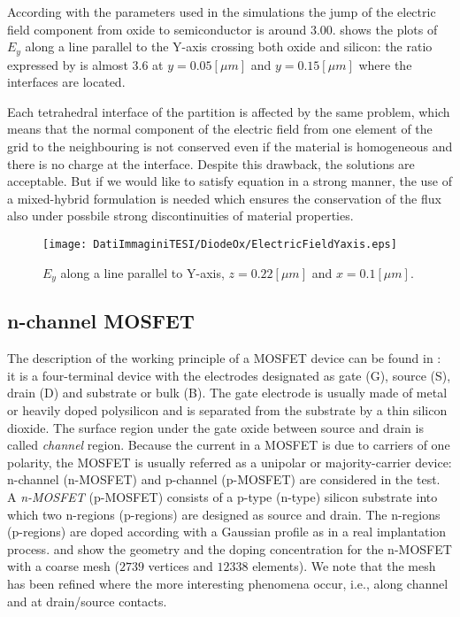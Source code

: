 According with the parameters used in the simulations the jump of the electric field component from oxide to semiconductor is around $3.00$.  shows the plots of $E_y$ along a line parallel to the Y-axis crossing both oxide and silicon: the ratio expressed by  is almost $3.6$ at $y=0.05[\mu m]$ and $y = 0.15[\mu m]$ where the interfaces are located.

Each tetrahedral interface of the partition is affected by the same problem, which means that the normal component of the electric field from one element of the grid to the neighbouring is not conserved even if the material is homogeneous and there is no charge at the interface. Despite this drawback, the solutions are acceptable. But if we would like to satisfy equation  in a strong manner, the use of a mixed-hybrid formulation is needed which ensures the conservation of the flux also under possbile strong discontinuities of material properties.


\begin{figure}[!h]
\centering
\texttt{[image: DatiImmaginiTESI/DiodeOx/ElectricFieldYaxis.eps]}
\caption{$E_y$ along a line parallel to Y-axis, $z=0.22[\mu m]$ and $x=0.1[\mu m]$.}
\label{fig: salto electric field}
\end{figure}


\clearpage





\subsection{n-channel MOSFET}
\label{sec: MOS}

The description of the working principle of a MOSFET device can be found in \cite{ModernVLSIdevices}: it is a four-terminal device with the electrodes designated as gate (G), source (S), drain (D) and substrate or bulk (B). The gate electrode is usually made of metal or heavily doped polysilicon and is separated from the substrate by a thin silicon dioxide. The surface region under the gate oxide between source and drain is called \textit{channel} region.
Because the current in a MOSFET is due to carriers of one polarity, the MOSFET is usually referred as a unipolar or majority-carrier device: n-channel (n-MOSFET) and p-channel (p-MOSFET) are considered in the test. A \textit{n-MOSFET} (p-MOSFET) consists of a p-type (n-type) silicon substrate into which two n-regions (p-regions) are designed as source and drain. The n-regions (p-regions) are doped according with a Gaussian profile as in a real implantation process. 
 and  show the geometry and the doping concentration for the n-MOSFET with a coarse mesh ($2739$ vertices and $12338$ elements). 
We note that the mesh has been refined where the more interesting phenomena occur, i.e., along channel and at drain/source contacts.

